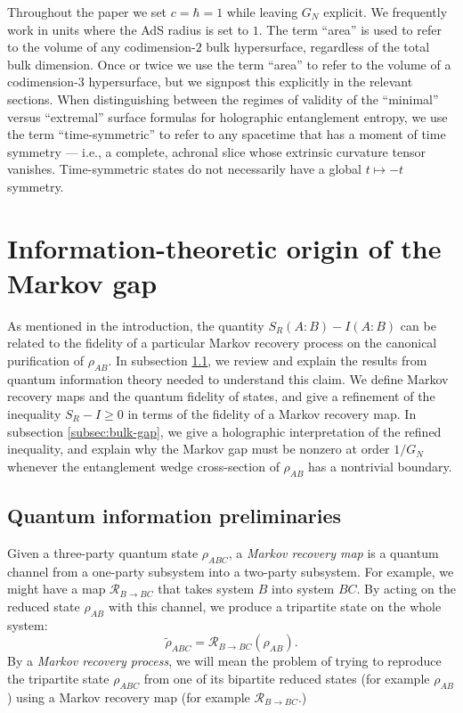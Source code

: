 \documentclass[a4paper,11pt]{article}
\renewcommand{\tilde}{\widetilde}
\begin{document}
Throughout the paper we set $c = \hbar = 1$ while leaving $G_N$ explicit. We frequently work in units where the AdS radius is set to $1$. The term ``area'' is used to refer to the volume of any codimension-$2$ bulk hypersurface, regardless of the total bulk dimension. Once or twice we use the term ``area'' to refer to the volume of a codimension-$3$ hypersurface, but we signpost this explicitly in the relevant sections. When distinguishing between the regimes of validity of the ``minimal'' versus ``extremal'' surface formulas for holographic entanglement entropy, we use the term ``time-symmetric'' to refer to any spacetime that has a moment of time symmetry --- i.e., a complete, achronal slice whose extrinsic curvature tensor vanishes. Time-symmetric states do not necessarily have a global $t \mapsto -t$ symmetry.

\section{Information-theoretic origin of the Markov gap}
\label{sec:info-theory}

As mentioned in the introduction, the quantity $S_R(A:B) - I(A:B)$ can be related to the fidelity of a particular Markov recovery process on the canonical purification of $\rho_{AB}$. In subsection \ref{subsec:QI-prelims}, we review and explain the results from quantum information theory needed to understand this claim. We define Markov recovery maps and the quantum fidelity of states, and give a refinement of the inequality $S_R - I \geq 0$ in terms of the fidelity of a Markov recovery map. In subsection \ref{subsec:bulk-gap}, we give a holographic interpretation of the refined inequality, and explain why the Markov gap must be nonzero at order $1/G_N$ whenever the entanglement wedge cross-section of $\rho_{AB}$ has a nontrivial boundary.

\subsection{Quantum information preliminaries}
\label{subsec:QI-prelims}

Given a three-party quantum state $\rho_{ABC}$, a \emph{Markov recovery map} is a quantum channel from a one-party subsystem into a two-party subsystem. For example, we might have a map $\mathcal{R}_{B \rightarrow BC}$ that takes system $B$ into system $BC$. By acting on the reduced state $\rho_{AB}$ with this channel, we produce a tripartite state on the whole system:
\begin{equation}
    \tilde{\rho}_{ABC} = \mathcal{R}_{B \rightarrow BC}(\rho_{AB}).
\end{equation}
By a \emph{Markov recovery process}, we will mean the problem of trying to reproduce the tripartite state $\rho_{ABC}$ from one of its bipartite reduced states (for example $\rho_{AB}$) using a Markov recovery map (for example $\mathcal{R}_{B \rightarrow BC}$.)
\end{document}
